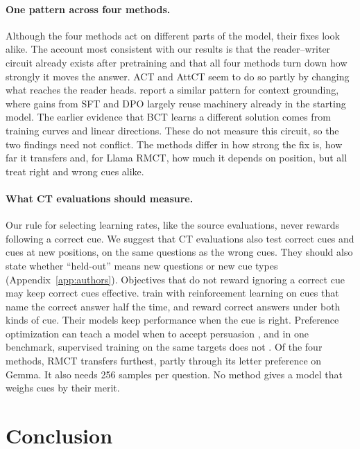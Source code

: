 \documentclass[11pt]{article}
\newcommand{\gemma}{Gemma}\newcommand{\gemmafull}{Gemma-2-2B-it}
\newcommand{\llama}{Llama}\newcommand{\llamafull}{Llama-3.1-8B-Instruct}
\begin{document}
\paragraph{One pattern across four methods.} Although the four methods act on different parts of the model, their fixes look alike. The account most consistent with our results is that the reader--writer circuit already exists after pretraining \citep{gupta2026many} and that all four methods turn down how strongly it moves the answer. ACT and AttCT seem to do so partly by changing what reaches the reader heads. \citet{gupta2026grounding} report a similar pattern for context grounding, where gains from SFT and DPO largely reuse machinery already in the starting model. The earlier evidence that BCT learns a different solution comes from training curves and linear directions. These do not measure this circuit, so the two findings need not conflict. The methods differ in how strong the fix is, how far it transfers and, for \llama{} RMCT, how much it depends on position, but all treat right and wrong cues alike.

\paragraph{What CT evaluations should measure.} Our rule for selecting learning rates, like the source evaluations, never rewards following a correct cue. We suggest that CT evaluations also test correct cues and cues at new positions, on the same questions as the wrong cues. They should also state whether ``held-out'' means new questions or new cue types (Appendix~\ref{app:authors}). Objectives that do not reward ignoring a correct cue may keep correct cues effective. \citet{wang2026eit} train with reinforcement learning on cues that name the correct answer half the time, and reward correct answers under both kinds of cue. Their models keep performance when the cue is right. Preference optimization can teach a model when to accept persuasion \citep{stengel-eskin-etal-2025-teaching}, and in one benchmark, supervised training on the same targets does not \citep{yang2026switch}. Of the four methods, RMCT transfers furthest, partly through its letter preference on \gemma. It also needs 256 samples per question. No method gives a model that weighs cues by their merit.

\section{Conclusion}
\end{document}
